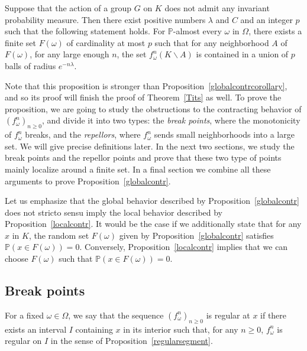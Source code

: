 \documentclass[AHL,Unicode,longabstracts,published]{cedram}
\newcommand{\bbP}{\mathbb{P}}
\newcounter{setofcase}
\newcounter{case}[setofcase]
\begin{document}
\begin{prop}\label{globalcontr}
Suppose that the action of a group $G$ on $K$ does not admit any invariant probability measure. Then there exist positive numbers $\lambda$ and $C$ and an integer $p$ such that the following statement holds. For $\bbP$-almost every $\omega$ in $\Omega$, there exists a finite set $F(\omega)$ of cardinality at most $p$ such that for any neighborhood $A$ of $F(\omega)$, for any large enough $n$, the set $f_\omega^n(K\backslash A)$ is contained in a union of $p$ balls of radius $e^{-n\lambda}$.
\end{prop}


Note that this proposition is stronger than Proposition~\ref{globalcontrcorollary}, and so its proof will finish the proof of Theorem~\ref{Tits} as well. To prove the proposition, we are going to study the obstructions to the contracting behavior of $(f_\omega^n)_{n\geq 0}$, and divide it into two types: the \emph{break points}, where the monotonicity of $f_\omega^n$ breaks, and the \emph{repellors}, where $f_\omega^n$ sends small neighborhoods into a large set. We will give precise definitions later. In the next two sections, we study the break points and the repellor points and prove that these two type of points mainly localize around a finite set. In a final section we combine all these arguments to prove Proposition~\ref{globalcontr}.

\begin{rema}
Let us emphasize that the global behavior described by Proposition~\ref{globalcontr} does not stricto sensu imply the local behavior described by Proposition~\ref{localcontr}. It would be the case if we additionally state that for any $x$ in $K$, the random set $F(\omega)$ given by Proposition~\ref{globalcontr} satisfies $\bbP(x\in F(\omega))=0$. Conversely, Proposition~\ref{localcontr} implies that we can choose $F(\omega)$ such that $\bbP(x\in F(\omega))=0$.
\end{rema}



\subsection{Break points}

For a fixed $\omega \in \Omega$, we say that the sequence $(f_\omega^n)_{n\geq 0}$ is regular at $x$ if there exists an interval $I$ containing $x$ in its interior such that, for any $n\geq 0$, $f_\omega^n$ is regular on $I$ in the sense of Proposition~\ref{regularsegment}.
\end{document}
